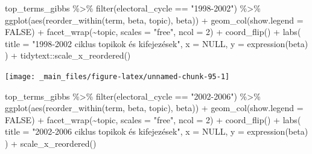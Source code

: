 \documentclass[
]{book}
\newenvironment{Shaded}{\begin{snugshade}}{\end{snugshade}}
\newcommand{\AttributeTok}[1]{\textcolor[rgb]{0.77,0.63,0.00}{#1}}
\newcommand{\ConstantTok}[1]{\textcolor[rgb]{0.00,0.00,0.00}{#1}}
\newcommand{\DecValTok}[1]{\textcolor[rgb]{0.00,0.00,0.81}{#1}}
\newcommand{\FunctionTok}[1]{\textcolor[rgb]{0.00,0.00,0.00}{#1}}
\newcommand{\NormalTok}[1]{#1}
\newcommand{\SpecialCharTok}[1]{\textcolor[rgb]{0.00,0.00,0.00}{#1}}
\newcommand{\StringTok}[1]{\textcolor[rgb]{0.31,0.60,0.02}{#1}}
\begin{document}
\begin{Shaded}
\begin{Highlighting}[]
\NormalTok{top\_terms\_gibbs }\SpecialCharTok{\%\textgreater{}\%}
  \FunctionTok{filter}\NormalTok{(electoral\_cycle }\SpecialCharTok{==} \StringTok{"1998{-}2002"}\NormalTok{) }\SpecialCharTok{\%\textgreater{}\%}
  \FunctionTok{ggplot}\NormalTok{(}\FunctionTok{aes}\NormalTok{(}\FunctionTok{reorder\_within}\NormalTok{(term, beta, topic), beta)) }\SpecialCharTok{+}
  \FunctionTok{geom\_col}\NormalTok{(}\AttributeTok{show.legend =} \ConstantTok{FALSE}\NormalTok{) }\SpecialCharTok{+}
  \FunctionTok{facet\_wrap}\NormalTok{(}\SpecialCharTok{\textasciitilde{}}\NormalTok{topic, }\AttributeTok{scales =} \StringTok{"free"}\NormalTok{, }\AttributeTok{ncol =} \DecValTok{2}\NormalTok{) }\SpecialCharTok{+}
  \FunctionTok{coord\_flip}\NormalTok{() }\SpecialCharTok{+}
  \FunctionTok{labs}\NormalTok{(}
    \AttributeTok{title =} \StringTok{"1998{-}2002 ciklus topikok és kifejezések"}\NormalTok{,}
    \AttributeTok{x =} \ConstantTok{NULL}\NormalTok{,}
    \AttributeTok{y =} \FunctionTok{expression}\NormalTok{(beta)}
\NormalTok{  ) }\SpecialCharTok{+}
\NormalTok{  tidytext}\SpecialCharTok{::}\FunctionTok{scale\_x\_reordered}\NormalTok{()}
\end{Highlighting}
\end{Shaded}

\begin{center}\texttt{[image: \_main\_files/figure-latex/unnamed-chunk-95-1]} \end{center}

\begin{Shaded}
\begin{Highlighting}[]
\NormalTok{top\_terms\_gibbs }\SpecialCharTok{\%\textgreater{}\%}
  \FunctionTok{filter}\NormalTok{(electoral\_cycle }\SpecialCharTok{==} \StringTok{"2002{-}2006"}\NormalTok{) }\SpecialCharTok{\%\textgreater{}\%}
  \FunctionTok{ggplot}\NormalTok{(}\FunctionTok{aes}\NormalTok{(}\FunctionTok{reorder\_within}\NormalTok{(term, beta, topic), beta)) }\SpecialCharTok{+}
  \FunctionTok{geom\_col}\NormalTok{(}\AttributeTok{show.legend =} \ConstantTok{FALSE}\NormalTok{) }\SpecialCharTok{+}
  \FunctionTok{facet\_wrap}\NormalTok{(}\SpecialCharTok{\textasciitilde{}}\NormalTok{topic, }\AttributeTok{scales =} \StringTok{"free"}\NormalTok{, }\AttributeTok{ncol =} \DecValTok{2}\NormalTok{) }\SpecialCharTok{+}
  \FunctionTok{coord\_flip}\NormalTok{() }\SpecialCharTok{+}
  \FunctionTok{labs}\NormalTok{(}
    \AttributeTok{title =} \StringTok{"2002{-}2006 ciklus topikok és kifejezések"}\NormalTok{,}
    \AttributeTok{x =} \ConstantTok{NULL}\NormalTok{,}
    \AttributeTok{y =} \FunctionTok{expression}\NormalTok{(beta)}
\NormalTok{  ) }\SpecialCharTok{+}
  \FunctionTok{scale\_x\_reordered}\NormalTok{()}
\end{Highlighting}
\end{Shaded}
\end{document}
